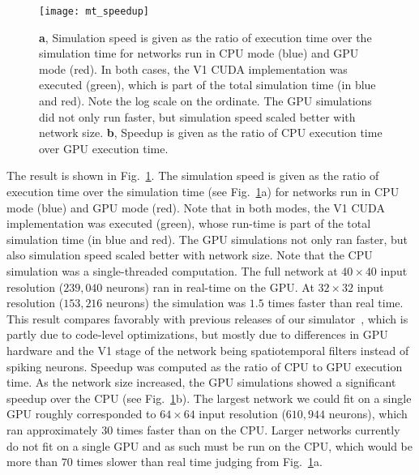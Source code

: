 \begin{figure}[t]
  \centering
  \texttt{[image: mt\_speedup]}
  \caption{
  \textbf{a}, Simulation speed is given as the ratio of 
  execution time over the
  simulation time for networks run in \ac{CPU} mode (blue) and 
  \ac{GPU} mode (red). In both cases, the \ac{V1} \ac{CUDA}
  implementation was executed (green), which is part of the total
  simulation time (in blue and red).
  Note the log scale on the ordinate.
  The \ac{GPU} simulations did not only run faster, but simulation 
  speed scaled better with network size.
  \textbf{b}, Speedup is given as the ratio of \ac{CPU} execution 
  time over \ac{GPU} execution time.}
  \label{fig:MT|speedup}
\end{figure}

The result is shown in Fig.~\ref{fig:MT|speedup}.
The simulation speed is given as the ratio of execution time
over the simulation time (see Fig.~\ref{fig:MT|speedup}a)
for networks run in \ac{CPU} mode (blue) and \ac{GPU} mode (red). 
Note that in both modes, the \ac{V1} \ac{CUDA} implementation 
was executed (green), whose run-time is part of the total 
simulation time (in blue and red). 
The \ac{GPU} simulations not only ran faster, but
also simulation speed scaled better with network size. Note
that the \ac{CPU} simulation was a single-threaded computation.
The full network at $40\times40$ input resolution ($239,040$ neurons)
ran in real-time on the \ac{GPU}. At $32\times32$ input resolution
($153,216$ neurons) the simulation was $1.5$ times faster than
real time. This result compares favorably with previous releases
of our simulator~\citep{Nageswaran2009,Richert2011},
which is partly due to code-level optimizations, but
mostly due to differences in \ac{GPU} hardware and the \ac{V1} stage
of the network being spatiotemporal filters instead of spiking
neurons.
Speedup was computed as the ratio of \ac{CPU} to \ac{GPU} execution
time. As the network size increased, the \ac{GPU} simulations
showed a significant speedup over the \ac{CPU} 
(see Fig.~\ref{fig:MT|speedup}b).
The largest network we could fit on a single \ac{GPU}
roughly corresponded to $64\times64$ input resolution ($610,944$
neurons), which ran approximately $30$ times faster than on
the \ac{CPU}. Larger networks currently do not fit on a single 
\ac{GPU} and as such must be run on the \ac{CPU}, 
which would be more than $70$ times slower than real time 
judging from Fig.~\ref{fig:MT|speedup}a.



